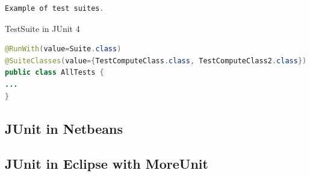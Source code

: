 \documentclass[11pt, xcolor=svgnames]{beamer}
\begin{document}
\begin{frame}[fragile]

\begin{lstlisting}[language=JAVA,basicstyle=\scriptsize]
Example of test suites.
\end{lstlisting}

\end{frame}

\begin{frame}[fragile]{TestSuite in JUnit 4}


\begin{lstlisting}[language=JAVA,basicstyle=\scriptsize]
@RunWith(value=Suite.class)
@SuiteClasses(value={TestComputeClass.class, TestComputeClass2.class})
public class AllTests {
...
}
\end{lstlisting}
\end{frame}







\subsection{JUnit in Netbeans}





\subsection{JUnit in Eclipse with MoreUnit}

\end{document}
